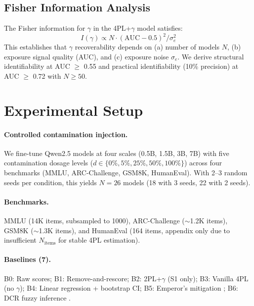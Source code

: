 \documentclass[11pt,a4paper]{article}
\begin{document}
\subsection{Fisher Information Analysis}

The Fisher information for $\gamma$ in the 4PL+$\gamma$ model satisfies:
\begin{equation}
I(\gamma) \propto N \cdot (\text{AUC} - 0.5)^2 / \sigma_e^2
\label{eq:fisher}
\end{equation}
This establishes that $\gamma$ recoverability depends on (a) number of models $N$, (b) exposure signal quality (AUC), and (c) exposure noise $\sigma_e$.
We derive structural identifiability at AUC $\geq$ 0.55 and practical identifiability (10\% precision) at AUC $\geq$ 0.72 with $N \geq 50$.

\section{Experimental Setup}

\paragraph{Controlled contamination injection.}
We fine-tune Qwen2.5 models at four scales (0.5B, 1.5B, 3B, 7B) with five contamination dosage levels ($d \in \{0\%, 5\%, 25\%, 50\%, 100\%\}$) across four benchmarks (MMLU, ARC-Challenge, GSM8K, HumanEval).
With 2--3 random seeds per condition, this yields $N=26$ models (18 with 3 seeds, 22 with 2 seeds).

\paragraph{Benchmarks.}
MMLU (14K items, subsampled to 1000), ARC-Challenge ($\sim$1.2K items), GSM8K ($\sim$1.3K items), and HumanEval (164 items, appendix only due to insufficient $N_{\text{items}}$ for stable 4PL estimation).

\paragraph{Baselines (7).}
B0: Raw scores; B1: Remove-and-rescore; B2: 2PL+$\gamma$ (S1 only); B3: Vanilla 4PL (no $\gamma$); B4: Linear regression + bootstrap CI; B5: Emperor's mitigation \citep{xu2024benchmarking}; B6: DCR fuzzy inference \citep{oren2024proving}.
\end{document}
